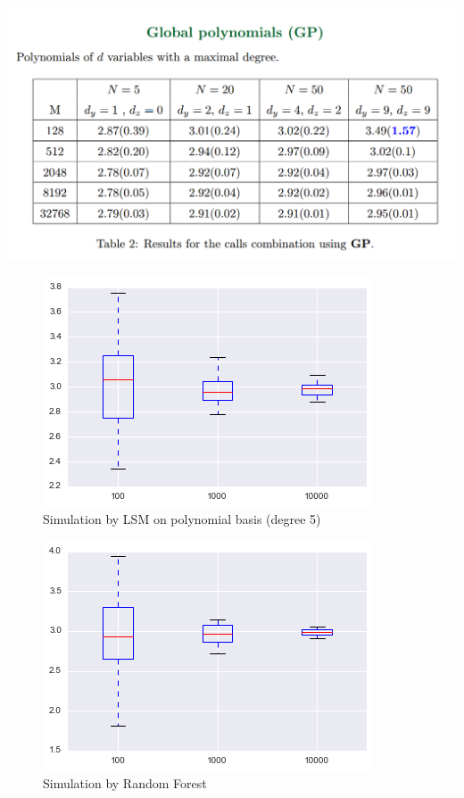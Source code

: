 \documentclass[english,a4paper,12pt,titlepage]{book}
\begin{document}
 \begin{center}
 	\includegraphics[scale=0.65]{Spread_option_Gobet1.png}
 \end{center}



 \begin{figure}[!htb]
 	\centering
 	\includegraphics[scale=0.65]{BSDE_1D_different_rates_LSM_SPread_Option.png}
 	\caption{Simulation by LSM on polynomial basis (degree 5)}
	\end{figure}


\begin{figure}[!htb]
	\centering
	\includegraphics[scale=0.65]{BSDE_1D_different_rates_RF_SPread_Option.png}
	\caption{Simulation by Random Forest}
\end{figure}
\end{document}
